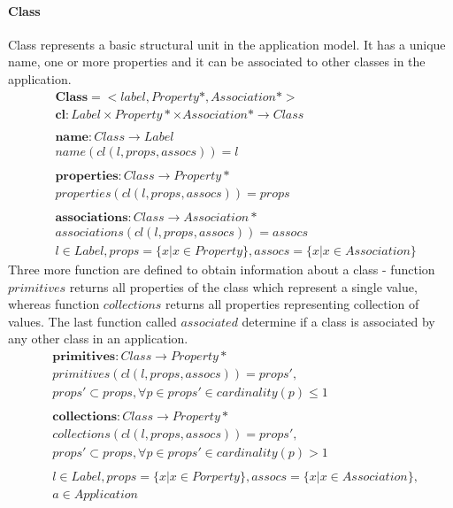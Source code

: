\documentclass[11pt]{article}
\begin{document}
\paragraph{Class} Class represents a basic structural unit in the application model. It has a unique name, one or more properties and it can be associated to other classes in the application. 
\begin{align*}
& 	\mathbf{Class} = <label, Property*, Association*> \\
& 	\mathbf{cl} : Label \times Property* \times Association* \rightarrow Class \\\\
& 	\mathbf{name} : Class \rightarrow Label \\
& 	name(cl(l, props, assocs)) = l \\ \\
& 	\mathbf{properties} : Class \rightarrow Property* \\
& 	properties(cl(l, props, assocs)) = props \\ \\
& 	\mathbf{associations} : Class \rightarrow Association* \\ 
& 	associations(cl(l, props, assocs)) = assocs \\ 
& 	l \in Label, props = \{ x | x \in Property\}, assocs = \{ x | x \in Association \}
\end{align*}
Three more function are defined to obtain information about a class - function $primitives$ returns all properties of the class which represent a single value, whereas function $collections$ returns all properties representing collection of values. The last function called $associated$ determine if a class is associated by any other class in an application.
\begin{align*}
&	\mathbf{primitives} : Class \rightarrow Property* \\
&	primitives(cl(l, props, assocs)) = props', \\ 
& props' \subset props,  \forall p \in props' \in cardinality(p) \leq 1 \\ \\
&	\mathbf{collections} : Class \rightarrow Property* \\	
& collections(cl(l, props, assocs)) = props',  \\
& props' \subset props, \forall p \in props' \in cardinality(p) > 1 \\ \\
&	l \in Label, props = \{ x | x \in Porperty\}, assocs  = \{ x | x \in Association\}, \\
& a \in Application
\end{align*}
	 
\end{document}

